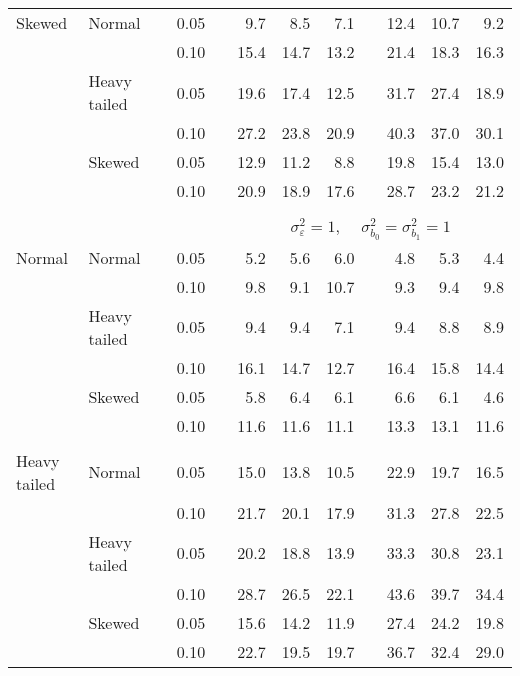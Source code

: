 \begin{table}[ht]
\begin{scriptsize}
\begin{center}
\begin{tabular}{ll p{.1cm} c p{.1cm} rrr p{.1cm} rrr}
Skewed       & Normal       && 0.05 &&   9.7 & 8.5 & 7.1 &   & 12.4 & 10.7 & 9.2 \\ 
             &              && 0.10 &&   15.4 & 14.7 & 13.2 &   & 21.4 & 18.3 & 16.3 \\ 
             & Heavy tailed && 0.05 &&   19.6 & 17.4 & 12.5 &   & 31.7 & 27.4 & 18.9 \\ 
             &              && 0.10 &&   27.2 & 23.8 & 20.9 &   & 40.3 & 37.0 & 30.1 \\ 
             & Skewed       && 0.05 &&   12.9 & 11.2 & 8.8 &   & 19.8 & 15.4 & 13.0 \\ 
             &              && 0.10 &&   20.9 & 18.9 & 17.6 &   & 28.7 & 23.2 & 21.2 \\ 

&&&&&&&&&&&\\
& && && \multicolumn{7}{c}{$\sigma_{\varepsilon}^2 = 1$, \ \ $\sigma_{b_0}^2 = \sigma_{b_1}^2 = 1$} \\ \cline{6-12}
\rowcolor{gray!20}Normal       & Normal       && 0.05 &&   5.2 & 5.6 & 6.0 &   & 4.8 & 5.3 & 4.4 \\ 
\rowcolor{gray!20}             &              && 0.10 &&   9.8 & 9.1 & 10.7 &   & 9.3 & 9.4 & 9.8 \\ 
\rowcolor{gray!20}             & Heavy tailed && 0.05 &&   9.4 & 9.4 & 7.1 &   & 9.4 & 8.8 & 8.9 \\ 
\rowcolor{gray!20}             &              && 0.10 &&   16.1 & 14.7 & 12.7 &   & 16.4 & 15.8 & 14.4 \\ 
\rowcolor{gray!20}             & Skewed       && 0.05 &&   5.8 & 6.4 & 6.1 &   & 6.6 & 6.1 & 4.6 \\ 
\rowcolor{gray!20}             &              && 0.10 &&   11.6 & 11.6 & 11.1 &   & 13.3 & 13.1 & 11.6 \\ 
&&&&&&&&&&&\\
Heavy tailed & Normal       && 0.05 &&   15.0 & 13.8 & 10.5 &   & 22.9 & 19.7 & 16.5 \\ 
             &              && 0.10 &&   21.7 & 20.1 & 17.9 &   & 31.3 & 27.8 & 22.5 \\ 
             & Heavy tailed && 0.05 &&   20.2 & 18.8 & 13.9 &   & 33.3 & 30.8 & 23.1 \\ 
             &              && 0.10 &&   28.7 & 26.5 & 22.1 &   & 43.6 & 39.7 & 34.4 \\ 
             & Skewed       && 0.05 &&   15.6 & 14.2 & 11.9 &   & 27.4 & 24.2 & 19.8 \\ 
             &              && 0.10 &&   22.7 & 19.5 & 19.7 &   & 36.7 & 32.4 & 29.0 \\ 

\end{tabular}
\end{center}
\end{scriptsize}
\end{table}
